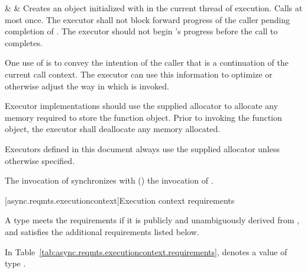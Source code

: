 \begin{libreqtab3}
  &
  &
\effects Creates an object  initialized with  in the current thread of execution. Calls  at most once. The executor shall not block forward progress of the caller pending completion of . The executor should not begin 's progress before the call to  completes. \begin{note} One use of  is to convey the intention of the caller that  is a continuation of the current call context. The executor can use this information to optimize or otherwise adjust the way in which  is invoked. \end{note}  Executor implementations should use the supplied allocator to allocate any memory required to store the function object. Prior to invoking the function object, the executor shall deallocate any memory allocated. \begin{note} Executors defined in this document always use the supplied allocator unless otherwise specified. \end{note}\br
\sync The invocation of  synchronizes with () the invocation of .  \\

\end{libreqtab3}



[async.reqmts.executioncontext]{Execution context requirements}

%
\pnum
A type  meets the  requirements if it is publicly and unambiguously derived from , and satisfies the additional requirements listed below.

\pnum
In Table~\ref{tab:async.reqmts.executioncontext.requirements},  denotes a value of type .

